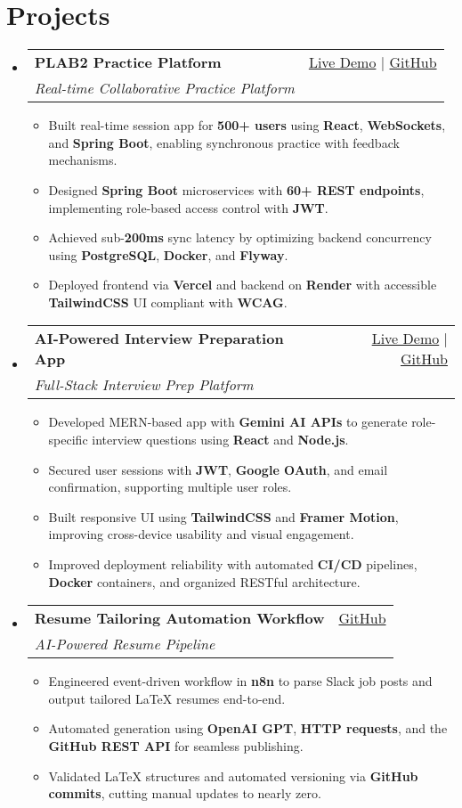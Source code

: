 \documentclass[letterpaper,10pt]{article}
\makeatletter
\newcommand{\resumeItem}[1]{\item\small{#1 \vspace{-2pt}}}
\newcommand{\resumeSubheading}[4]{
  \vspace{-1pt}\item
    \begin{tabular*}{0.97\textwidth}[t]{l@{\extracolsep{\fill}}r}
      \textbf{#1} & #2 \\
      \textit{\small#3} & \textit{\small #4} \\
    \end{tabular*}\vspace{-5pt}
}
\newcommand{\resumeSubHeadingListStart}{\begin{itemize}[leftmargin=*]}
\newcommand{\resumeSubHeadingListEnd}{\end{itemize}}
\newcommand{\resumeItemListStart}{\begin{itemize}}
\newcommand{\resumeItemListEnd}{\end{itemize}\vspace{-5pt}}
\makeatother
\begin{document}
\section{Projects}
  \resumeSubHeadingListStart
    \resumeSubheading
      {\textbf{PLAB2 Practice Platform}}{\href{https://plab2practice.com}{Live Demo} | \href{https://github.com/altansaid/plab2projectnew}{GitHub}}
      {Real-time Collaborative Practice Platform}{}
      \resumeItemListStart
        \resumeItem{Built real-time session app for \textbf{500+ users} using \textbf{React}, \textbf{WebSockets}, and \textbf{Spring Boot}, enabling synchronous practice with feedback mechanisms.}
        \resumeItem{Designed \textbf{Spring Boot} microservices with \textbf{60+ REST endpoints}, implementing role-based access control with \textbf{JWT}.}
        \resumeItem{Achieved sub-\textbf{200ms} sync latency by optimizing backend concurrency using \textbf{PostgreSQL}, \textbf{Docker}, and \textbf{Flyway}.}
        \resumeItem{Deployed frontend via \textbf{Vercel} and backend on \textbf{Render} with accessible \textbf{TailwindCSS} UI compliant with \textbf{WCAG}.}
      \resumeItemListEnd

    \resumeSubheading
      {\textbf{AI-Powered Interview Preparation App}}{\href{https://interviewcoach-ai.vercel.app}{Live Demo} | \href{https://github.com/altansaid/interviewcoach-ai}{GitHub}}
      {Full-Stack Interview Prep Platform}{}
      \resumeItemListStart
        \resumeItem{Developed MERN-based app with \textbf{Gemini AI APIs} to generate role-specific interview questions using \textbf{React} and \textbf{Node.js}.}
        \resumeItem{Secured user sessions with \textbf{JWT}, \textbf{Google OAuth}, and email confirmation, supporting multiple user roles.}
        \resumeItem{Built responsive UI using \textbf{TailwindCSS} and \textbf{Framer Motion}, improving cross-device usability and visual engagement.}
        \resumeItem{Improved deployment reliability with automated \textbf{CI/CD} pipelines, \textbf{Docker} containers, and organized RESTful architecture.}
      \resumeItemListEnd

    \resumeSubheading
      {\textbf{Resume Tailoring Automation Workflow}}{\href{https://github.com/altansaid/resume-updates}{GitHub}}{AI-Powered Resume Pipeline}{}
      \resumeItemListStart
        \resumeItem{Engineered event-driven workflow in \textbf{n8n} to parse Slack job posts and output tailored LaTeX resumes end-to-end.}
        \resumeItem{Automated generation using \textbf{OpenAI GPT}, \textbf{HTTP requests}, and the \textbf{GitHub REST API} for seamless publishing.}
        \resumeItem{Validated LaTeX structures and automated versioning via \textbf{GitHub commits}, cutting manual updates to nearly zero.}
      \resumeItemListEnd
  \resumeSubHeadingListEnd
\end{document}
